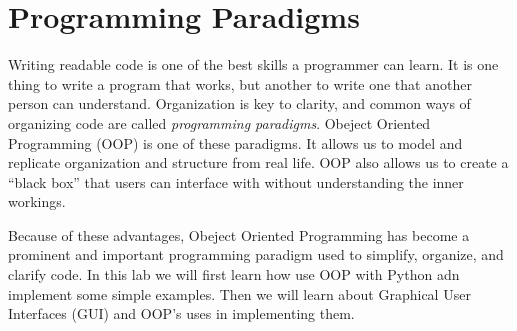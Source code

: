 \label{lab:OOP}

\section*{Programming Paradigms}

Writing readable code is one of the best skills a programmer can learn.
It is one thing to write a program that works, but another to write one that another person can understand.
Organization is key to clarity, and common ways of organizing code are called \emph{programming paradigms}.
Obeject Oriented Programming (OOP) is one of these paradigms.
It allows us to model and replicate organization and structure from real life.
OOP also allows us to create a ``black box'' that users can interface with without understanding the inner workings.

Because of these advantages, Obeject Oriented Programming has become a prominent and important programming paradigm used to simplify, organize, and clarify code. 
In this lab we will first learn how use OOP with Python adn implement some simple examples. 
Then we will learn about Graphical User Interfaces (GUI) and OOP's uses in implementing them.


\begin{comment}
A way of organizing a program is often called a ``paradigm."

Paradigms are designed to create better code by structuring or organizing the code in a more meaningful way.
Code without any structure is often referred to as ``spaghetti code.''
Spaghetti can be very easy to write, but very difficult to understand or modify.
\emph{Structured programming} emphasizes the use of programming structures to select or repeat the execution of blocks of code.
It is good practice to structure your programs in such a way that they are easy to understand, extend, or reuse.
Making extensive use of procedures (or subfunctions) is a characteristic of \emph{procedural programming}.
The work of the program is done in the subfunctions with one main function supervising the calling of each subfunction.

Another important, albeit specialized, paradigm is \li{object oriented programming} (or OOP).
The concept of object oriented programming is to model a problem as the interaction of a collection of objects.
There are many other paradigms such as declarative, event-driven, and array programming.
\end{comment}



